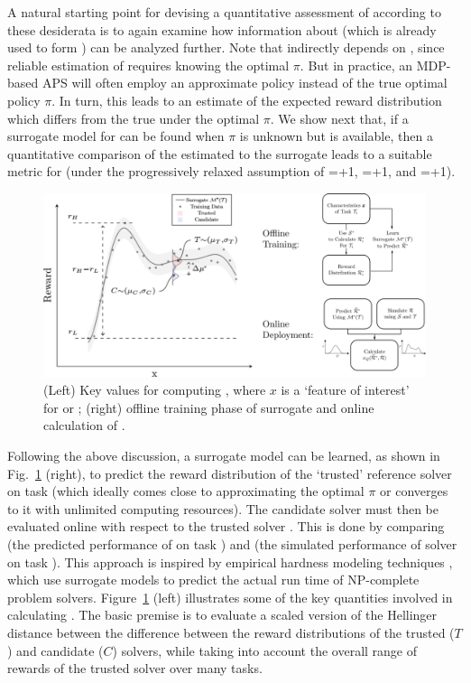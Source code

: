 A natural starting point for devising a quantitative assessment of \xQ{} according to these desiderata is to again examine how information about \pri{} (which is already used to form \xO{}) can be analyzed further. 
Note that \xO{} indirectly depends on \xQ{}, since reliable estimation of \ppiri{} requires knowing the optimal $\pi$. But in practice, an MDP-based APS will often employ an approximate policy \tpi{} instead of the true optimal policy $\pi$. In turn, this leads to an estimate \ppitri{} of the expected reward distribution which differs from the true \ppiri{} under the optimal $\pi$. We show next that, if a surrogate model for \ppiri{} can be found when $\pi$ is unknown but \tpi{} is available, then a quantitative comparison of the estimated \ppitri{} to the surrogate \ppiri{} leads to a suitable metric for \xQ{} (under the progressively relaxed assumption of \xM{}=+1, \xP{}=+1, and \xI{}=+1). 
    
    \begin{figure}[tb]
        \centering
        \includegraphics[width=0.79\linewidth]{Figures/SQ_AllCombined.png}
        \caption{(Left) Key values for computing \xQ, where $x$ is a `feature of interest' for \task or \solve; (right) offline training phase of surrogate \surrogate{} and online calculation of \xQ{}. }
        \label{fig:sq_v3}
        \vspace{-0.2cm}
    \end{figure}

Following the above discussion, a surrogate model \surrogate{} can be learned, as shown in Fig.~\ref{fig:sq_v3} (right), to predict the reward distribution \rwdstarapprox{} of the `trusted' reference solver \solvestar{} on task \task{} (which ideally comes close to approximating the optimal $\pi$ or converges to it with unlimited computing resources). The candidate solver \solve{} must then be evaluated online with respect to the trusted solver \solvestar{}. This is done by comparing \rwdstarapprox{} (the predicted performance of \solvestar{} on task \task) and \rwd{} (the simulated performance of solver \solve{} on task \task). 
This approach is inspired by empirical hardness modeling techniques \cite{Leyton-Brown2009-yr}, which use surrogate models to predict the actual run time of NP-complete problem solvers. 
Figure~\ref{fig:sq_v3} (left) illustrates some of the key quantities involved in calculating \xQ{}. The basic premise is to evaluate a scaled version of the Hellinger distance between the difference between the reward distributions of the trusted ($T$) and candidate ($C$) solvers, while taking into account the overall range of rewards of the trusted solver over many tasks. 

